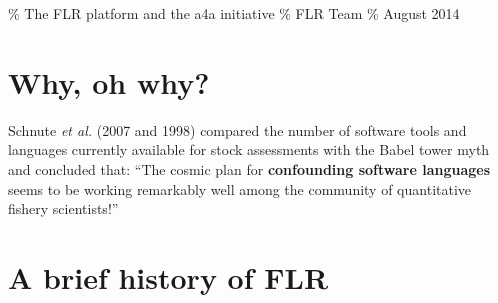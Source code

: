 \documentclass[]{article}
\title{}
\author{}
\date{}
\begin{document}
\% The FLR platform and the a4a initiative \% FLR Team \% August 2014

\section{Why, oh why?}\label{why-oh-why}

Schnute \emph{et al.} (2007 and 1998) compared the number of software
tools and languages currently available for stock assessments with the
Babel tower myth and concluded that: ``The cosmic plan for
\textbf{confounding software languages} seems to be working remarkably
well among the community of quantitative fishery scientists!''

\section{A brief history of FLR}\label{a-brief-history-of-flr}
\end{document}
